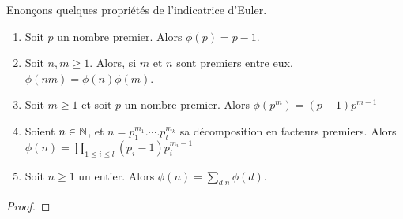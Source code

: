 Enonçons quelques propriétés de l'indicatrice d'Euler.

\begin{proposition}
	\begin{enumerate}
		\item Soit $p$ un nombre premier. Alors $\phi(p) = p - 1$.
		\item Soit $n, m \geq 1$. Alors, si $m$ et $n$ sont premiers entre eux,
			$\phi(n m) = \phi(n) \phi(m)$.
		\item Soit $m \geq 1$ et soit $p$ un nombre premier. Alors $\phi(p^{m})
			= (p - 1) p^{m - 1}$
		\item Soient $n \in \mathbb{N}$, et $n = p_{1}^{m_{1}} . \cdots .
			p_{l}^{m_{k}}$ sa décomposition en facteurs premiers. Alors
			$\phi(n) = \displaystyle \prod_{1 \leq i \leq l} (p_{i} - 1)
			p_{i}^{m_{i} - 1}$
		\item Soit $n \geq 1$ un entier. Alors $\phi(n) = \displaystyle \sum_{d | n}
			\phi(d)$.
	\end{enumerate}
\end{proposition}

\ifdefined\outputproof
\begin{proof}

\end{proof}
\fi





